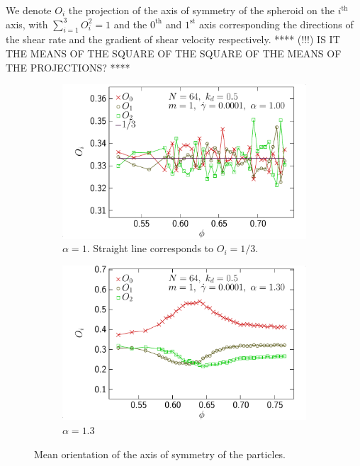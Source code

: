 \documentclass[class=report, float=false, crop=false]{standalone}
\begin{document}
We denote $O_i$ the projection of the axis of symmetry of the spheroid on the $i^{\text{th}}$ axis, with $\sum_{i=1}^3 O_i^2 = 1$ and the $0^{\text{th}}$ and $1^{\text{st}}$ axis corresponding the directions of the shear rate and the gradient of shear velocity respectively. **** (!!!) IS IT THE MEANS OF THE SQUARE OF THE SQUARE OF THE MEANS OF THE PROJECTIONS? ****

\begin{figure}[h!]
\centering
    \begin{subfigure}[t]{0.49\textwidth}
        \centering
        \includegraphics[width=\textwidth]{figures/figs/ori_phi_0064_KDk500_Ml100_GDh100_EL100}
        \caption{$\alpha=1$. Straight line corresponds to $O_i=1/3$.}
        \label{ori_phi_0064_KDk500_Ml100_GDh100_EL100}
    \end{subfigure}
    \hfill
    \begin{subfigure}[t]{0.49\textwidth}
        \centering
        \includegraphics[width=\textwidth]{figures/figs/ori_phi_0064_KDk500_Ml100_GDh100_EL130}
        \caption{$\alpha=1.3$}
        \label{ori_phi_0064_KDk500_Ml100_GDh100_EL130}
    \end{subfigure}
    \caption{Mean orientation of the axis of symmetry of the particles.}
    \label{ori_phi_0064}
\end{figure}
\end{document}
